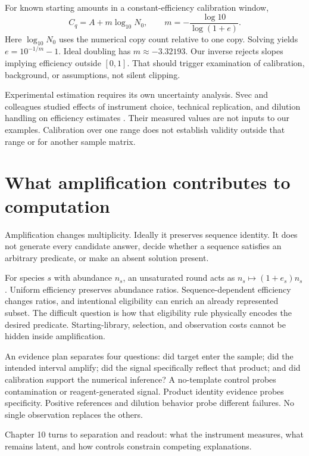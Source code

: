 For known starting amounts in a constant-efficiency calibration window,
\begin{equation}
C_q=A+m\log_{10}N_0,\qquad
m=-\frac{\log 10}{\log(1+e)}.
\end{equation}
Here $\log_{10}N_0$ uses the numerical copy count relative to one copy. Solving yields $e=10^{-1/m}-1$. Ideal doubling has $m\approx-3.32193$. Our inverse rejects slopes implying efficiency outside $[0,1]$. That should trigger examination of calibration, background, or assumptions, not silent clipping.

Experimental estimation requires its own uncertainty analysis. Svec and colleagues studied effects of instrument choice, technical replication, and dilution handling on efficiency estimates \cite{Svec2015}. Their measured values are not inputs to our examples. Calibration over one range does not establish validity outside that range or for another sample matrix.

\section{What amplification contributes to computation}
Amplification changes multiplicity. Ideally it preserves sequence identity. It does not generate every candidate answer, decide whether a sequence satisfies an arbitrary predicate, or make an absent solution present.

For species $s$ with abundance $n_s$, an unsaturated round acts as $n_s\mapsto(1+e_s)n_s$. Uniform efficiency preserves abundance ratios. Sequence-dependent efficiency changes ratios, and intentional eligibility can enrich an already represented subset. The difficult question is how that eligibility rule physically encodes the desired predicate. Starting-library, selection, and observation costs cannot be hidden inside amplification.

An evidence plan separates four questions: did target enter the sample; did the intended interval amplify; did the signal specifically reflect that product; and did calibration support the numerical inference? A no-template control probes contamination or reagent-generated signal. Product identity evidence probes specificity. Positive references and dilution behavior probe different failures. No single observation replaces the others.

Chapter 10 turns to separation and readout: what the instrument measures, what remains latent, and how controls constrain competing explanations.

